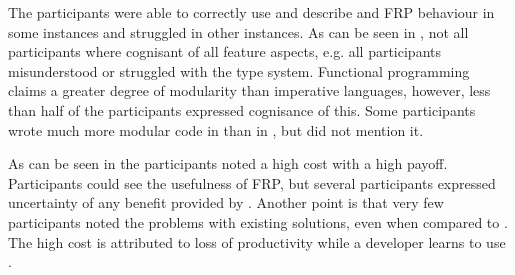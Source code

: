 The participants were able to correctly use and describe \fsh and \gls{FRP} behaviour in some instances and struggled in other instances. As can be seen in , not all participants where cognisant of all feature aspects, e.g. all participants misunderstood or struggled with the type system. Functional programming claims a greater degree of modularity than imperative languages\cite{hughes1989functional}, however, less than half of the participants expressed cognisance of this. Some participants wrote much more modular code in \fsh than in \csh, but did not mention it.

As can be seen in  the participants noted a high cost with a high payoff. Participants could see the usefulness of \gls{FRP}, but several participants expressed uncertainty of any benefit provided by \fsh. Another point is that very few participants noted the problems with existing solutions, even when compared to \fsh. The high cost is attributed to loss of productivity while a developer learns to use \fsh.
